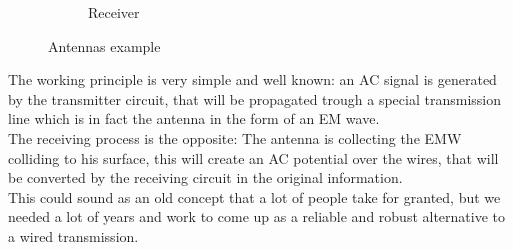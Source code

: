 \begin{figure}[H]
\begin{subfigure}[b]{0.45\textwidth}
{ }   
        \caption{Receiver}
    \end{subfigure}\caption{Antennas example}\label{fig:antennas_example}
\end{figure}
The working principle is very simple and well known: an AC signal is generated by the transmitter circuit, that will be propagated trough a special transmission line which is in fact the antenna in the form of an EM wave.\\
The receiving process is the opposite: The antenna is collecting the EMW colliding to his surface, this will create an AC potential over the wires, that will be converted by the receiving circuit in the original information.\\
This could sound as an old concept that a lot of people take for granted, but we needed a lot of years and work to come up as a reliable and robust alternative to a wired transmission.
